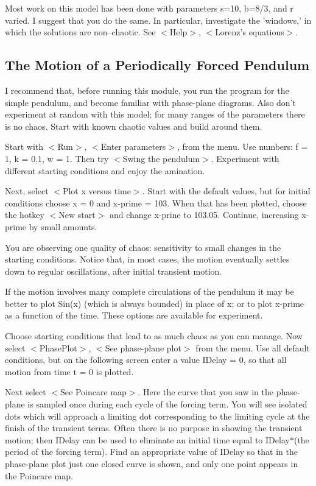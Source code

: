    Most work on this model has been done with parameters s=10, b=8/3, and
r varied. I suggest that you do the same. In particular, investigate the
'windows,' in which the solutions are non--chaotic. See $<$Help$>$, $<$Lorenz's
equations$>$.


\subsection{The Motion of a Periodically Forced Pendulum}

   I recommend that, before running this module, you run the program for
the simple pendulum, and become familiar with phase-plane diagrams. Also
don't experiment at random with this model; for many ranges of the
parameters there is no chaos. Start with known chaotic values and build
around them.

   Start with $<$Run$>$, $<$Enter parameters$>$, from the menu. Use numbers:
f = 1, k = 0.1, w = 1. Then try $<$Swing the pendulum$>$. Experiment with
different starting conditions and enjoy the amination.

   Next, select $<$Plot x versus time$>$. Start with the default values, but
for initial conditions choose x = 0 and x-prime = 103. When that has been
plotted, choose the hotkey $<$New start$>$ and change x-prine to 103.05.
Continue, increasing x-prime by small amounts.

   You are observing one quality of chaos: sensitivity  to small changes
in the starting conditions. Notice that, in most cases, the motion
eventually settles down to regular oscillations, after initial transient
motion.

   If the motion involves many complete circulations of the pendulum
it may be better to plot Sin(x) (which is always bounded) in place of x;
or to plot x-prime as a function of the time. These options are available
for experiment.

   Choose starting conditions that lead to as much chaos as you can manage.
Now select $<$PhasePlot$>$, $<$See phase-plane plot$>$ from the menu. Use all
default conditions, but on the following screen enter a value IDelay = 0,
so that all motion from time t = 0 is plotted.

   Next select $<$See Poincare map$>$. Here the curve that you saw in the
phase-plane is sampled once during each cycle of the forcing term. You
will see isolated dots which will approach a limiting dot corresponding
to the limiting cycle at the finish of the transient terms. Often there
is no purpose in showing the transient motion; then IDelay can be used
to eliminate an initial time equal to IDelay$*$(the period of the forcing
term). Find an appropriate value of IDelay so that in the phase-plane plot
just one closed curve is shown, and only one point appears in the Poincare
map.

